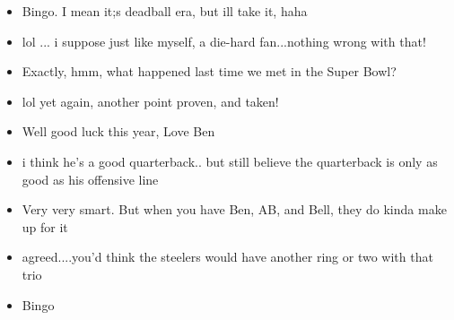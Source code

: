 \documentclass[11pt,a4paper]{article}
\begin{document}
\begin{itemize}
\item[\ding{173}] Bingo.  I mean it;s deadball era, but ill take it, haha
\item[\ding{172}] lol ... i suppose just like myself,  a die-hard fan...nothing wrong with that!
\item[\ding{173}] Exactly, hmm, what happened last time we met in the Super Bowl? 
\item[\ding{172}] lol yet again, another point proven, and taken!
\item[\ding{173}] Well good luck this year, Love Ben
\item[\ding{172}]  i think he's a good quarterback.. but still believe the quarterback is only as good as his offensive line
\item[\ding{173}] Very very smart.  But when you have Ben, AB, and Bell, they do kinda make up for it 
\item[\ding{172}] agreed....you'd think the steelers would have another ring or two with that trio
\item[\ding{173}] Bingo
\end{itemize}
\end{document}
